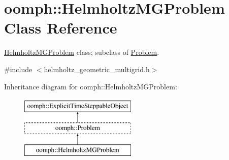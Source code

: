 \hypertarget{classoomph_1_1HelmholtzMGProblem}{}\section{oomph\+:\+:Helmholtz\+M\+G\+Problem Class Reference}
\label{classoomph_1_1HelmholtzMGProblem}


\hyperlink{classoomph_1_1HelmholtzMGProblem}{Helmholtz\+M\+G\+Problem} class; subclass of \hyperlink{classoomph_1_1Problem}{Problem}.  




{\ttfamily \#include $<$helmholtz\+\_\+geometric\+\_\+multigrid.\+h$>$}

Inheritance diagram for oomph\+:\+:Helmholtz\+M\+G\+Problem\+:\begin{figure}[H]
\begin{center}
\leavevmode
\includegraphics[height=3.000000cm]{classoomph_1_1HelmholtzMGProblem}
\end{center}
\end{figure}
